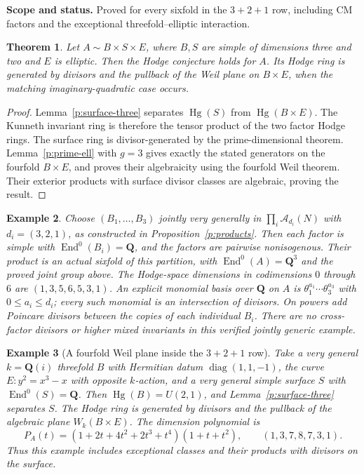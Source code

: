 \documentclass[10pt,reqno]{article}
\theoremstyle{emphasizedplain}
\newtheorem{theorem}{Theorem}[section]
\theoremstyle{emphasizeddefinition}
\newtheorem{example}[theorem]{Example}
\theoremstyle{emphasizeddefinition}
\DeclareMathOperator{\End}{End}
\DeclareMathOperator{\Hg}{Hg}
\newcommand{\Q}{\mathbf Q}
\newcommand{\status}[1]{%
  \par\nobreak\smallskip\noindent
  {\setlength{\fboxsep}{7pt}%
   \colorbox{ScopeBackground}{%
    \parbox{\dimexpr\linewidth-2\fboxsep\relax}{%
     \small\textbf{\textcolor{HeadingInk}{Scope and status.}} #1}}}%
  \par\nobreak\medskip}
\renewcommand{\small}{\fontsize{8.4}{10}\selectfont}
\begin{document}
\status{Proved for every sixfold in the $3+2+1$ row, including CM
factors and the exceptional threefold--elliptic interaction.}
\begin{theorem}
Let $A\sim B\times S\times E$, where $B,S$ are simple of dimensions
three and two and $E$ is elliptic. Then the Hodge conjecture holds for $A$.
Its Hodge ring is generated by divisors and the pullback of the Weil
plane on $B\times E$, when the matching imaginary-quadratic case occurs.
\end{theorem}
\begin{proof}
Lemma~\ref{p:surface-three} separates $\Hg(S)$ from $\Hg(B\times E)$.
The Kunneth invariant ring is therefore the tensor product of the two
factor Hodge rings. The surface ring is divisor-generated by the
prime-dimensional theorem. Lemma~\ref{p:prime-ell} with $g=3$ gives
exactly the stated generators on the fourfold $B\times E$, and proves
their algebraicity using the fourfold Weil theorem. Their exterior
products with surface divisor classes are algebraic, proving the result.
\end{proof}
\begin{example}
Choose $(B_1,\ldots,B_{3})$ jointly very generally in
$\prod_i\mathcal A_{d_i}(N)$ with $d_i=(3,2,1)$,
as constructed in Proposition~\ref{p:products}. Then each factor is
simple with $\End^0(B_i)=\Q$, and the factors are pairwise nonisogenous.
Their product is an actual sixfold of this partition, with
$\End^0(A)=\Q^{3}$ and the proved joint group above.
The Hodge-space dimensions in codimensions $0$ through $6$ are
$(1,3,5,6,5,3,1)$.
An explicit monomial basis over $\Q$ on $A$ is
$\theta_1^{a_1}\cdots\theta_{3}^{a_{3}}$ with
$0\leq a_i\leq d_i$; every such monomial is an intersection of divisors.
On powers add Poincare divisors between the copies of each individual
$B_i$. There are no cross-factor divisors or higher mixed invariants in
this verified jointly generic example.
\end{example}
\begin{example}[A fourfold Weil plane inside the $3+2+1$ row]\label{ex:N5weil}
Take a very general $k=\Q(i)$ threefold $B$ with Hermitian datum
$\operatorname{diag}(1,1,-1)$, the curve $E:y^2=x^3-x$ with opposite
$k$-action, and a very general simple surface $S$ with $\End^0(S)=\Q$.
Then $\Hg(B)=U(2,1)$, and Lemma~\ref{p:surface-three} separates $S$.
The Hodge ring is generated by divisors and the pullback of the
algebraic plane $W_k(B\times E)$. The dimension polynomial is
\[
 P_A(t)=(1+2t+4t^2+2t^3+t^4)(1+t+t^2),
 \qquad (1,3,7,8,7,3,1).
\]
Thus this example includes exceptional classes and their products
with divisors on the surface.
\end{example}
\end{document}
